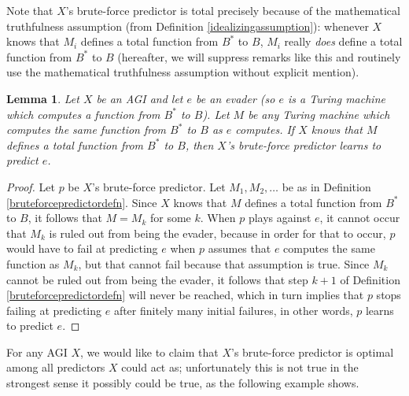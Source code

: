 \documentclass{article}
\newtheorem{lemma}[theorem]{Lemma}
\begin{document}
Note that $X$'s brute-force predictor
is total precisely because of the mathematical truthfulness assumption
(from Definition \ref{idealizingassumption}): whenever $X$ knows that
$M_i$ defines a total function from $B^*$ to $B$, $M_i$ really \emph{does}
define a total function from $B^*$ to $B$ (hereafter, we will suppress
remarks like this and routinely use the mathematical truthfulness assumption
without explicit mention).

\begin{lemma}
\label{knowingimplieslearninglemma}
    Let $X$ be an AGI and let $e$ be an evader (so $e$ is a Turing machine which
    computes a function from $B^*$ to $B$).
    Let $M$ be any Turing machine which computes the same function from $B^*$ to $B$
    as $e$ computes.
    If $X$ knows that $M$ defines a total function from $B^*$ to $B$,
    then $X$'s brute-force predictor learns to predict $e$.
\end{lemma}

\begin{proof}
    Let $p$ be $X$'s brute-force predictor.
    Let $M_1,M_2,\ldots$ be as in Definition \ref{bruteforcepredictordefn}.
    Since $X$ knows that $M$ defines a total
    function from $B^*$ to $B$,
    it follows that $M=M_k$ for some $k$.
    When $p$ plays against $e$, it cannot occur that $M_k$ is ruled out
    from being the evader, because in order for that to occur, $p$ would have
    to fail at predicting $e$ when $p$ assumes that $e$ computes the same
    function as $M_k$, but that cannot fail because that assumption is true.
    Since $M_k$ cannot be ruled out from being the evader, it follows that
    step $k+1$ of Definition \ref{bruteforcepredictordefn} will never be
    reached, which in turn implies that $p$ stops failing at predicting $e$
    after finitely many initial failures, in other words, $p$ learns to
    predict $e$.
\end{proof}

For any AGI $X$, we would like to claim that $X$'s brute-force predictor is
optimal among all predictors $X$ could act as; unfortunately this
is not true in the strongest sense it possibly could be true, as the following
example shows.
\end{document}
